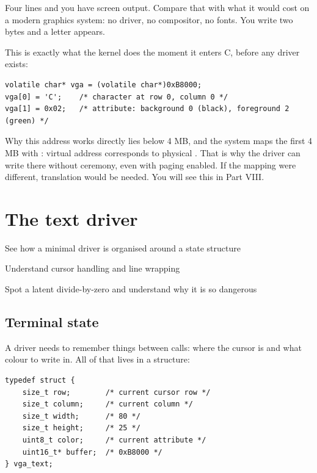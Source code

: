 Four lines and you have screen output. Compare that with what it would cost on a modern graphics
system: no driver, no compositor, no fonts. You write two bytes and a letter appears.

\begin{tryit}
This is exactly what the kernel does the moment it enters C, before any driver exists:
\begin{lstlisting}[style=c]
volatile char* vga = (volatile char*)0xB8000;
vga[0] = 'C';    /* character at row 0, column 0 */
vga[1] = 0x02;   /* attribute: background 0 (black), foreground 2 (green) */
\end{lstlisting}
\end{tryit}

\begin{warn}{Why this address works directly}
 lies below 4 MB, and the system maps the first 4 MB with : virtual
address  corresponds to physical . That is why the driver can write there
without ceremony, even with paging enabled. If the mapping were different, translation would be
needed. You will see this in Part VIII.
\end{warn}

\chapter{The text driver}

\begin{goals}
  \item See how a minimal driver is organised around a state structure
  \item Understand cursor handling and line wrapping
  \item Spot a latent divide-by-zero and understand why it is so dangerous
\end{goals}

\section{Terminal state}

A driver needs to remember things between calls: where the cursor is and what colour to write in.
All of that lives in a structure:

\begin{lstlisting}[style=c]
typedef struct {
    size_t row;        /* current cursor row */
    size_t column;     /* current column */
    size_t width;      /* 80 */
    size_t height;     /* 25 */
    uint8_t color;     /* current attribute */
    uint16_t* buffer;  /* 0xB8000 */
} vga_text;
\end{lstlisting}

